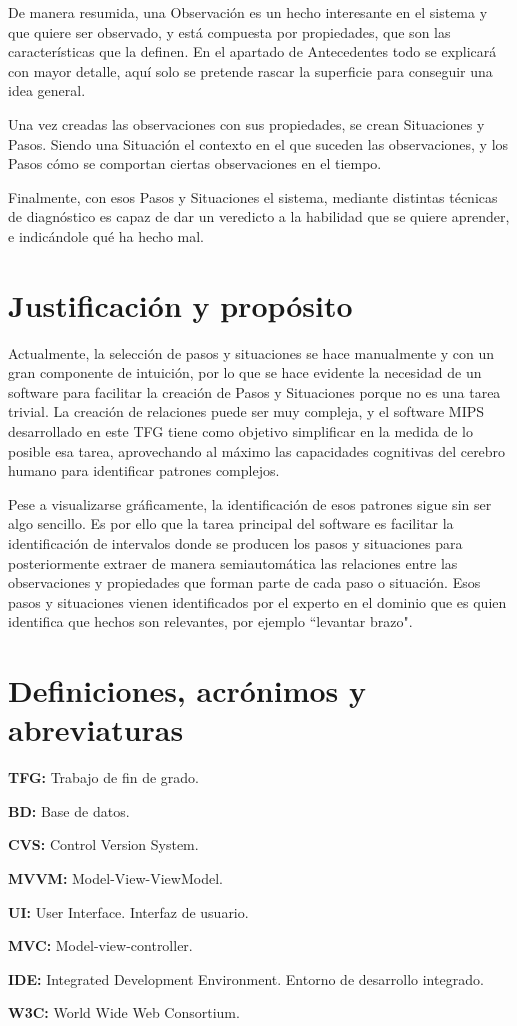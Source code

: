 De manera resumida, una Observaci\'on es un hecho interesante en el sistema y que quiere ser observado, y 
est\'a compuesta por propiedades, que son las caracter\'isticas que la definen. En el 
apartado de Antecedentes todo se explicar\'a con mayor detalle, aqu\'i solo se pretende rascar la superficie para 
conseguir una idea general.

Una vez creadas las observaciones con sus propiedades, se crean Situaciones y Pasos. Siendo una Situaci\'on el contexto
en el que suceden las observaciones, y los Pasos c\'omo se comportan ciertas observaciones en el tiempo.

Finalmente, con esos Pasos y Situaciones el sistema, mediante distintas t\'ecnicas de diagn\'ostico 
es capaz de dar un veredicto
a la habilidad que se quiere aprender, e indic\'andole qu\'e ha hecho mal.

\section{Justificaci\'{o}n y prop\'osito}
Actualmente, la selecci\'on de pasos y situaciones se hace manualmente y con un gran componente de intuici\'on,
por lo que se hace evidente la necesidad de un software para facilitar la creaci\'on de Pasos y Situaciones porque
no es una tarea trivial. La creaci\'on de relaciones puede ser muy compleja, y el software MIPS desarrollado
en este TFG
tiene como objetivo simplificar en la medida de lo posible esa tarea, aprovechando al m\'aximo las capacidades
cognitivas del cerebro humano para identificar
patrones complejos. 

Pese a visualizarse gr\'aficamente, la identificaci\'on de esos patrones sigue sin ser algo sencillo. Es
por ello que la tarea principal del software es facilitar la identificaci\'on de intervalos donde se producen los
pasos y situaciones para posteriormente extraer de manera semiautom\'atica las relaciones entre las observaciones y
propiedades que forman parte de cada paso o situaci\'on. Esos pasos y situaciones vienen identificados por el
experto en el dominio que es quien identifica que hechos son relevantes, por ejemplo
``levantar brazo".

\section{Definiciones, acr\'{o}nimos y abreviaturas}
\textbf{TFG:} Trabajo de fin de grado.

\textbf{BD:} Base de datos.

\textbf{CVS:} Control Version System.

\textbf{MVVM:} Model-View-ViewModel.

\textbf{UI:} User Interface. Interfaz de usuario.

\textbf{MVC:} Model-view-controller.

\textbf{IDE:} Integrated Development Environment. Entorno de desarrollo integrado.

\textbf{W3C:} World Wide Web Consortium.
 
